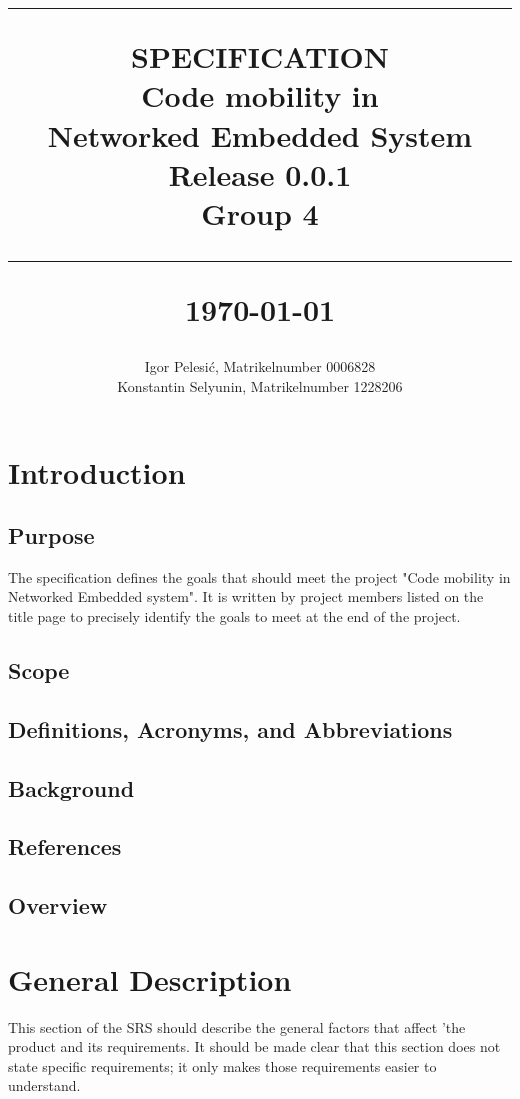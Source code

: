 \documentclass{scrreprt}
\title{%
\flushright
\rule{16cm}{2pt}\vskip1cm
\Huge{SPECIFICATION}\\
\vspace{1cm}
Code mobility in \\Networked Embedded System\\
\vspace{1cm}
\LARGE{Release 0.0.1\\}
\vspace{1cm}
Group 4\\
\vspace{1cm}
\author{Igor Pelesi\'c, Matrikelnumber 0006828\\
Konstantin Selyunin, Matrikelnumber 1228206}
\vfill
\rule{16cm}{2pt}\vskip1cm
\date{}
\today
}
\begin{document}
\maketitle
\tableofcontents
\renewcommand{\familydefault}{\sfdefault}

\chapter{Introduction}
\patchcmd{\chapter}{\if@openright\cleardoublepage\else\clearpage\fi}{}{}{}
  \section{Purpose}

The specification defines the goals that should meet the project "Code mobility in Networked Embedded system". It is written by project members listed on the title page to precisely identify the goals to meet at the end of the project.

  \section{Scope}

  \section{Definitions, Acronyms, and Abbreviations}

  \section{Background}

  \section{References}

  \section{Overview}

\chapter{General Description}

This section of the SRS should describe the general factors that affect 'the product and its requirements.  It should be made clear that this section does not state specific requirements; it only makes those requirements easier to understand.
\end{document}
